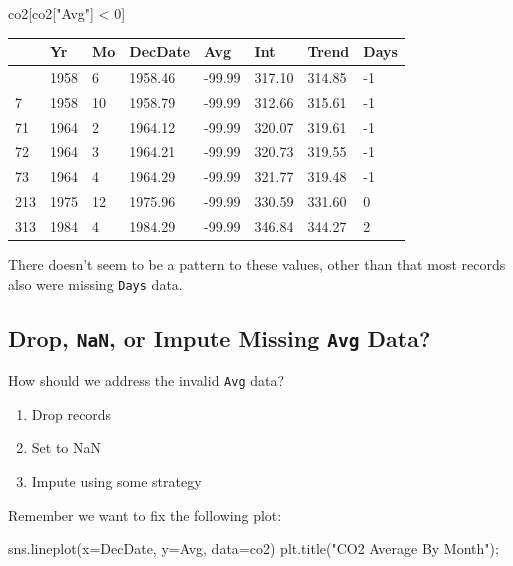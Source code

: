 \documentclass[
  letterpaper,
  DIV=11,
  numbers=noendperiod]{scrreprt}
\newenvironment{Shaded}{\begin{snugshade}}{\end{snugshade}}
\newcommand{\DecValTok}[1]{\textcolor[rgb]{0.68,0.00,0.00}{#1}}
\newcommand{\NormalTok}[1]{\textcolor[rgb]{0.00,0.23,0.31}{#1}}
\newcommand{\OperatorTok}[1]{\textcolor[rgb]{0.37,0.37,0.37}{#1}}
\newcommand{\StringTok}[1]{\textcolor[rgb]{0.13,0.47,0.30}{#1}}
\providecommand{\tightlist}{%
  \setlength{\itemsep}{0pt}\setlength{\parskip}{0pt}}\usepackage{longtable,booktabs,array}
\begin{document}
\begin{Shaded}
\begin{Highlighting}[]
\NormalTok{co2[co2[}\StringTok{"Avg"}\NormalTok{] }\OperatorTok{\textless{}} \DecValTok{0}\NormalTok{]}
\end{Highlighting}
\end{Shaded}

\begin{longtable}[]{@{}llllllll@{}}
\toprule\noalign{}
& Yr & Mo & DecDate & Avg & Int & Trend & Days \\
\midrule\noalign{}
\endhead
\bottomrule\noalign{}
\endlastfoot
3 & 1958 & 6 & 1958.46 & -99.99 & 317.10 & 314.85 & -1 \\
7 & 1958 & 10 & 1958.79 & -99.99 & 312.66 & 315.61 & -1 \\
71 & 1964 & 2 & 1964.12 & -99.99 & 320.07 & 319.61 & -1 \\
72 & 1964 & 3 & 1964.21 & -99.99 & 320.73 & 319.55 & -1 \\
73 & 1964 & 4 & 1964.29 & -99.99 & 321.77 & 319.48 & -1 \\
213 & 1975 & 12 & 1975.96 & -99.99 & 330.59 & 331.60 & 0 \\
313 & 1984 & 4 & 1984.29 & -99.99 & 346.84 & 344.27 & 2 \\
\end{longtable}

There doesn't seem to be a pattern to these values, other than that most
records also were missing \texttt{Days} data.

\subsection{\texorpdfstring{Drop, \texttt{NaN}, or Impute Missing
\texttt{Avg}
Data?}{Drop, NaN, or Impute Missing Avg Data?}}\label{drop-nan-or-impute-missing-avg-data}

How should we address the invalid \texttt{Avg} data?

\begin{enumerate}
\def\labelenumi{\arabic{enumi}.}
\tightlist
\item
  Drop records
\item
  Set to NaN
\item
  Impute using some strategy
\end{enumerate}

Remember we want to fix the following plot:

\begin{Shaded}
\begin{Highlighting}[]
\NormalTok{sns.lineplot(x}\OperatorTok{=}\StringTok{\textquotesingle{}DecDate\textquotesingle{}}\NormalTok{, y}\OperatorTok{=}\StringTok{\textquotesingle{}Avg\textquotesingle{}}\NormalTok{, data}\OperatorTok{=}\NormalTok{co2)}
\NormalTok{plt.title(}\StringTok{"CO2 Average By Month"}\NormalTok{)}\OperatorTok{;}
\end{Highlighting}
\end{Shaded}
\end{document}
